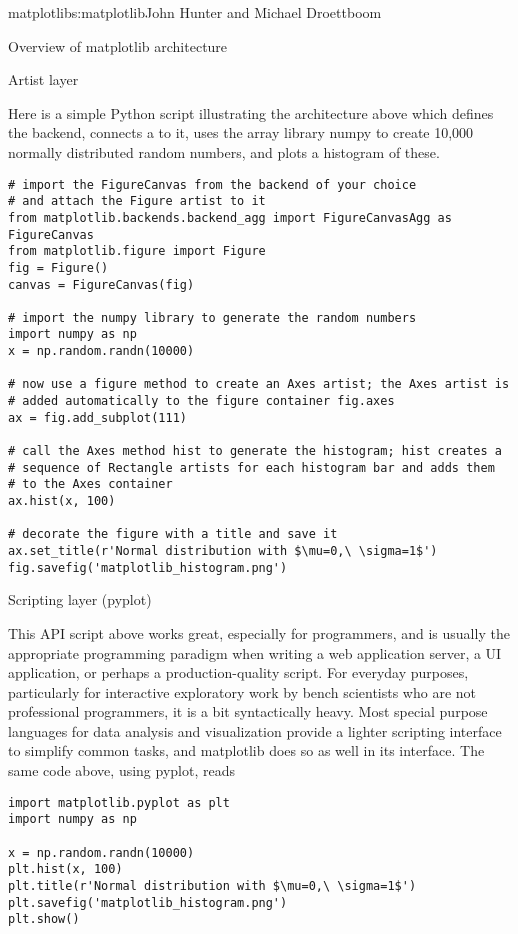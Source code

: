 \begin{aosachapter}{matplotlib}{s:matplotlib}{John Hunter and Michael Droettboom}
\begin{aosasect1}{Overview of matplotlib architecture}
\begin{aosasect2}{Artist layer}
\end{aosasect2}

Here is a simple Python script illustrating the architecture above
which defines the backend, connects a  to it, uses the array
library numpy to create 10,000 normally distributed random numbers,
and plots a histogram of these.

\begin{verbatim}
# import the FigureCanvas from the backend of your choice
# and attach the Figure artist to it
from matplotlib.backends.backend_agg import FigureCanvasAgg as FigureCanvas
from matplotlib.figure import Figure
fig = Figure()
canvas = FigureCanvas(fig)

# import the numpy library to generate the random numbers
import numpy as np
x = np.random.randn(10000)

# now use a figure method to create an Axes artist; the Axes artist is
# added automatically to the figure container fig.axes
ax = fig.add_subplot(111)

# call the Axes method hist to generate the histogram; hist creates a
# sequence of Rectangle artists for each histogram bar and adds them
# to the Axes container
ax.hist(x, 100)

# decorate the figure with a title and save it
ax.set_title(r'Normal distribution with $\mu=0,\ \sigma=1$')
fig.savefig('matplotlib_histogram.png')
\end{verbatim}

\begin{aosasect2}{Scripting layer (pyplot)}


This API script above works great, especially for programmers, and is
usually the appropriate programming paradigm when writing a web
application server, a UI application, or perhaps a production-quality
script.  For everyday purposes, particularly for interactive
exploratory work by bench scientists who are not professional
programmers, it is a bit syntactically heavy.  Most special purpose
languages for data analysis and visualization provide a lighter
scripting interface to simplify common tasks, and matplotlib does so
as well in its  interface.  The same code
above, using pyplot, reads

\begin{verbatim}
import matplotlib.pyplot as plt
import numpy as np

x = np.random.randn(10000)
plt.hist(x, 100)
plt.title(r'Normal distribution with $\mu=0,\ \sigma=1$')
plt.savefig('matplotlib_histogram.png')
plt.show()
\end{verbatim}


\end{aosasect2}
\end{aosasect1}
\end{aosachapter}
